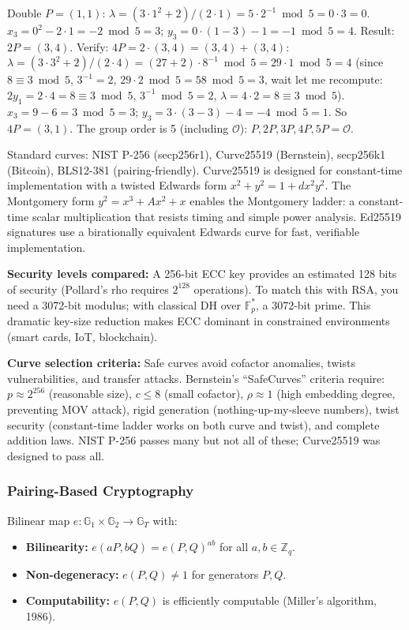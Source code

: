 Double $P = (1,1)$: $\lambda = (3\cdot 1^2 + 2) / (2\cdot 1) = 5 \cdot 2^{-1} \bmod 5 = 0 \cdot 3 = 0$. $x_3 = 0^2 - 2\cdot 1 = -2 \bmod 5 = 3$; $y_3 = 0 \cdot (1 - 3) - 1 = -1 \bmod 5 = 4$. Result: $2P = (3,4)$. Verify: $4P = 2 \cdot (3,4) = (3,4) + (3,4)$: $\lambda = (3\cdot 3^2 + 2) / (2\cdot 4) = (27+2) \cdot 8^{-1} \bmod 5 = 29 \cdot 1 \bmod 5 = 4$ (since $8 \equiv 3 \bmod 5$, $3^{-1}=2$, $29 \cdot 2 \bmod 5 = 58 \bmod 5 = 3$, wait let me recompute: $2y_1 = 2\cdot 4 = 8 \equiv 3 \bmod 5$, $3^{-1} \bmod 5 = 2$, $\lambda = 4 \cdot 2 = 8 \equiv 3 \bmod 5$). $x_3 = 9 - 6 = 3 \bmod 5 = 3$; $y_3 = 3\cdot(3 - 3) - 4 = -4 \bmod 5 = 1$. So $4P = (3,1)$. The group order is 5 (including $\mathcal{O}$): $P, 2P, 3P, 4P, 5P = \mathcal{O}$.

Standard curves: NIST P-256 (secp256r1), Curve25519 (Bernstein), secp256k1 (Bitcoin), BLS12-381 (pairing-friendly). Curve25519 is designed for constant-time implementation with a twisted Edwards form $x^2 + y^2 = 1 + dx^2y^2$. The Montgomery form $y^2 = x^3 + Ax^2 + x$ enables the Montgomery ladder: a constant-time scalar multiplication that resists timing and simple power analysis. Ed25519 signatures use a birationally equivalent Edwards curve for fast, verifiable implementation.

\textbf{Security levels compared:} A 256-bit ECC key provides an estimated 128 bits of security (Pollard's rho requires $2^{128}$ operations). To match this with RSA, you need a 3072-bit modulus; with classical DH over $\mathbb{F}_p^*$, a 3072-bit prime. This dramatic key-size reduction makes ECC dominant in constrained environments (smart cards, IoT, blockchain).

\textbf{Curve selection criteria:} Safe curves avoid cofactor anomalies, twists vulnerabilities, and transfer attacks. Bernstein's ``SafeCurves'' criteria require: $p \approx 2^{256}$ (reasonable size), $c \leq 8$ (small cofactor), $\rho \approx 1$ (high embedding degree, preventing MOV attack), rigid generation (nothing-up-my-sleeve numbers), twist security (constant-time ladder works on both curve and twist), and complete addition laws. NIST P-256 passes many but not all of these; Curve25519 was designed to pass all.

\subsubsection*{Pairing-Based Cryptography}
Bilinear map $e: \mathbb{G}_1 \times \mathbb{G}_2 \to \mathbb{G}_T$ with:
\begin{itemize}
\item \textbf{Bilinearity:} $e(aP, bQ) = e(P,Q)^{ab}$ for all $a,b \in \mathbb{Z}_q$.
\item \textbf{Non-degeneracy:} $e(P,Q) \neq 1$ for generators $P,Q$.
\item \textbf{Computability:} $e(P,Q)$ is efficiently computable (Miller's algorithm, 1986).
\end{itemize}

